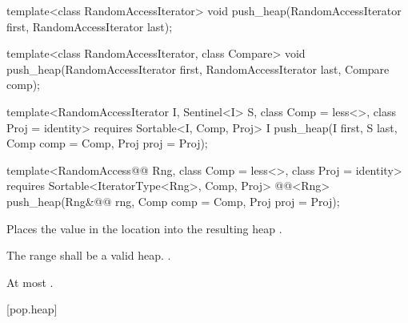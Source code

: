 %
\begin{removedblock}
\begin{itemdecl}
template<class RandomAccessIterator>
  void push_heap(RandomAccessIterator first, RandomAccessIterator last);

template<class RandomAccessIterator, class Compare>
  void push_heap(RandomAccessIterator first, RandomAccessIterator last,
                 Compare comp);
\end{itemdecl}
\end{removedblock}
\begin{addedblock}
\begin{itemdecl}
template<RandomAccessIterator I, Sentinel<I> S, class Comp = less<>,
    class Proj = identity>
  requires Sortable<I, Comp, Proj>
  I push_heap(I first, S last, Comp comp = Comp{}, Proj proj = Proj{});

template<RandomAccess@@ Rng, class Comp = less<>, class Proj = identity>
  requires Sortable<IteratorType<Rng>, Comp, Proj>
  @@<Rng>
    push_heap(Rng&@\newtxt{\&}@ rng, Comp comp = Comp{}, Proj proj = Proj{});
\end{itemdecl}
\end{addedblock}

\begin{itemdescr}
\pnum
\effects
Places the value in the location
into the resulting heap
.

\pnum
\requires
The range
shall be a valid heap.
.

\begin{addedblock}
\pnum
\returns {}
\end{addedblock}

\pnum
\complexity
At most
.
\end{itemdescr}

[pop.heap]{}

